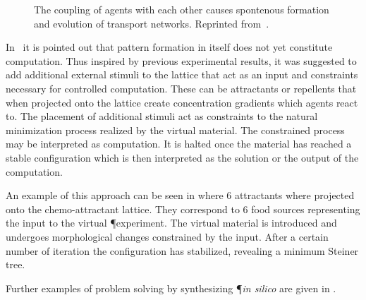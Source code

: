 			\begin{figure}
				\centering
				
				
				\caption[Multi-agent \P - Evolution of agents]{The coupling of agents with each other causes spontenous formation and evolution of transport networks. Reprinted from~\cite{jones2016multi}.}
				\label{fig:agent_evolution}
			\end{figure}

			In~\cite{jones2016multi} it is pointed out that pattern formation in itself does not yet constitute computation. Thus inspired by previous experimental results, it was suggested to add additional external stimuli to the lattice that act as an input and constraints necessary for controlled computation. These can be attractants or repellents that when projected onto the lattice create concentration gradients which agents react to. The placement of additional stimuli act as constraints to the natural minimization process realized by the virtual material. The constrained process may be interpreted as computation. It is halted once the material has reached a stable configuration which is then interpreted as the solution or the output of the computation.

			An example of this approach can be seen in  where $6$ attractants where projected onto the chemo-attractant lattice. They correspond to $6$ food sources representing the input to the virtual \P experiment. The virtual material is introduced and undergoes morphological changes constrained by the input. After a certain number of iteration the configuration has stabilized, revealing a minimum Steiner tree.

			Further examples of problem solving by synthesizing \P \textit{in silico} are given in .

